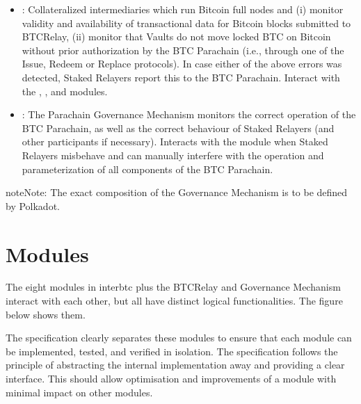 \documentclass[a4paper,10pt,english]{sphinxmanual}
\begin{document}
\begin{itemize}
\begin{itemize}
\end{itemize}

\item {} 
:  Collateralized intermediaries which run Bitcoin full nodes and (i) monitor validity and availability of transactional data for Bitcoin blocks submitted to BTC\sphinxhyphen{}Relay, (ii) monitor that Vaults do not move locked BTC on Bitcoin without prior authorization by the BTC Parachain (i.e., through one of the Issue, Redeem or Replace protocols). In case either of the above errors was detected, Staked Relayers report this to the BTC Parachain. Interact with the {\hyperref[\detokenize{spec/btc-relay:btc-relay}]{}}, {\hyperref[\detokenize{spec/security:security}]{}}, and {\hyperref[\detokenize{spec/vault-registry:vault-registry}]{}} modules.

\end{itemize}
\begin{itemize}
\item {} 
: The Parachain Governance Mechanism monitors the correct operation of the BTC Parachain, as well as the correct behaviour of Staked Relayers (and other participants if necessary). Interacts with the {\hyperref[\detokenize{spec/security:security}]{}} module when Staked Relayers misbehave and can manually interfere with the operation and parameterization of all components of the BTC Parachain.

\end{itemize}

\begin{sphinxadmonition}{note}{Note:}
The exact composition of the Governance Mechanism is to be defined by Polkadot.
\end{sphinxadmonition}


\section{Modules}
\label{\detokenize{intro/architecture:modules}}
The eight modules in interbtc plus the BTC\sphinxhyphen{}Relay and Governance Mechanism interact with each other, but all have distinct logical functionalities. The figure below shows them.

The specification clearly separates these modules to ensure that each module can be implemented, tested, and verified in isolation. The specification follows the principle of abstracting the internal implementation away and providing a clear interface. This should allow optimisation and improvements of a module with minimal impact on other modules.
\end{document}
